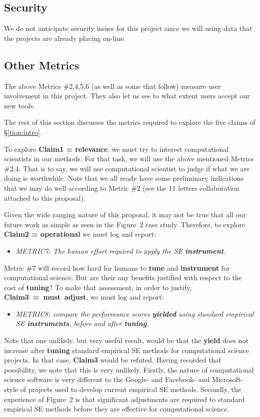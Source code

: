 \documentclass{NSF}
\newenvironment{myitemize}
{ \begin{itemize}
    \setlength{\itemsep}{0pt}
    \setlength{\parskip}{0pt}
    \setlength{\parsep}{0pt}     }
{ \end{itemize}                  }
\newcommand{\bi}{\begin{myitemize}}
\newcommand{\ei}{\end{myitemize}}
\newcommand{\tion}[1]{\S\ref{tion:#1}}
\begin{document}
\begin{nsfdescription}
\subsection{Security} 
We do not anticipate security issues for this project since we will using data that the projects are already placing on-line.

 
 
\subsection{Other Metrics}\label{tion:other}
The above Metrics \#2,4,5,6 (as well as some that follow)  measure
user involvement in this project. They also let us see to what extent
users accept our new tools.

The rest of this section discusses the metrics required
to explore  the
five claims of \tion{intro}.   

To  explore   {\bf Claim1 = relevance}, we must try
to interest   computational scientists in our methods.
For that task, we will use the above mentioned
Metrics \#2,4.    That is to say, we will use computational scientist to judge if what we are doing
is worthwhile.  Note that we all ready have some preliminary indications that we may do well
according to Metric \#2 (see the 11 letters collaboration attached to this proposal).

Given the wide ranging nature of this
proposal, it may not be true that all our future
work as simple as seen in the Figure~2 case study.
Therefore, to explore  {\bf Claim2 = operational} we must log and report:
\bi
\item {\em METRIC7: The human effort
 required to apply the SE {\bf instrument}.} 
\ei
Metric \#7 will record how hard for humans to  {\bf tune} and {\bf instrument} for computational
science. But are their any benefits justified with respect to  the cost of {\bf tuning}?
To make that assessment, in order to justify,
 \mbox{{\bf Claim3 = must adjust}}, we must log and report:
\bi
\item {\em METRIC8: compare the  performance 
scores {\bf yielded}
using standard empirical SE {\bf instruments}, before and after {\bf tuning}.}
\ei
Note that one unlikely, but very useful result,
would be that the {\bf yield} does not
increase after {\bf tuning}
standard empirical SE methods for computational
science projects. In that case, {\bf Claim3} would be refuted.
Having recorded that possibility, we note that this is very unlikely.
Firstly, the nature of computational science software is very different to the Google- and Facebook- and Microsoft- style of projects used to develop current empirical SE
methods. Secondly, the experience of Figure~2 is that significant adjustments are required
to standard empirical SE methods before they are effective for computational science.


\end{nsfdescription}
\end{document}
